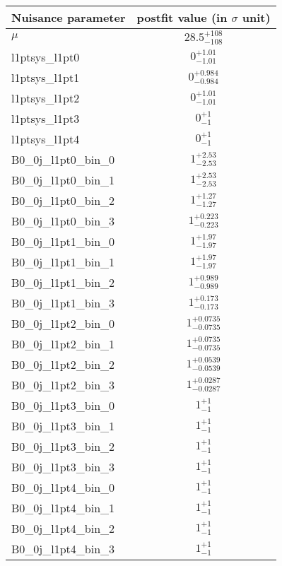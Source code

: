 
\begin{tabular}{|l|c|}
\hline
Nuisance parameter & postfit value (in $\sigma$ unit) \\\hline
$\mu$ & $28.5^{+108}_{-108}$ \\
l1ptsys\_l1pt0 & $0^{+1.01}_{-1.01}$ \\
l1ptsys\_l1pt1 & $0^{+0.984}_{-0.984}$ \\
l1ptsys\_l1pt2 & $0^{+1.01}_{-1.01}$ \\
l1ptsys\_l1pt3 & $0^{+1}_{-1}$ \\
l1ptsys\_l1pt4 & $0^{+1}_{-1}$ \\
B0\_0j\_l1pt0\_bin\_0 & $1^{+2.53}_{-2.53}$ \\
B0\_0j\_l1pt0\_bin\_1 & $1^{+2.53}_{-2.53}$ \\
B0\_0j\_l1pt0\_bin\_2 & $1^{+1.27}_{-1.27}$ \\
B0\_0j\_l1pt0\_bin\_3 & $1^{+0.223}_{-0.223}$ \\
B0\_0j\_l1pt1\_bin\_0 & $1^{+1.97}_{-1.97}$ \\
B0\_0j\_l1pt1\_bin\_1 & $1^{+1.97}_{-1.97}$ \\
B0\_0j\_l1pt1\_bin\_2 & $1^{+0.989}_{-0.989}$ \\
B0\_0j\_l1pt1\_bin\_3 & $1^{+0.173}_{-0.173}$ \\
B0\_0j\_l1pt2\_bin\_0 & $1^{+0.0735}_{-0.0735}$ \\
B0\_0j\_l1pt2\_bin\_1 & $1^{+0.0735}_{-0.0735}$ \\
B0\_0j\_l1pt2\_bin\_2 & $1^{+0.0539}_{-0.0539}$ \\
B0\_0j\_l1pt2\_bin\_3 & $1^{+0.0287}_{-0.0287}$ \\
B0\_0j\_l1pt3\_bin\_0 & $1^{+1}_{-1}$ \\
B0\_0j\_l1pt3\_bin\_1 & $1^{+1}_{-1}$ \\
B0\_0j\_l1pt3\_bin\_2 & $1^{+1}_{-1}$ \\
B0\_0j\_l1pt3\_bin\_3 & $1^{+1}_{-1}$ \\
B0\_0j\_l1pt4\_bin\_0 & $1^{+1}_{-1}$ \\
B0\_0j\_l1pt4\_bin\_1 & $1^{+1}_{-1}$ \\
B0\_0j\_l1pt4\_bin\_2 & $1^{+1}_{-1}$ \\
B0\_0j\_l1pt4\_bin\_3 & $1^{+1}_{-1}$ \\
\hline
\end{tabular}
